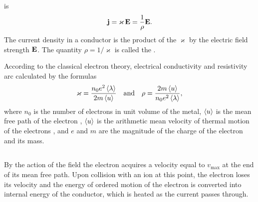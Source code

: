 \subsection{}\label{20.3.4}  is
\begin{equation*}%
\vb{j} = \varkappa \, \vb{E} = \frac{1}{\rho} \vb{E}.
\end{equation*}
The current density in a conductor is the product of the  $\varkappa$ by the electric field strength $\vb{E}$. The quantity $\rho = 1/\varkappa$ is called the .

According to the classical electron theory, electrical conductivity and resistivity arc calculated by the formulas
\begin{equation*}%
\varkappa = \frac{n_{0}e^{2}\expval{\lambda}}{2m \expval{u}} \qand \rho = \frac{2m \expval{u}}{n_{0}e^{2}\expval{\lambda}},
\end{equation*}
where $n_{0}$ is the number of electrons in unit volume of the metal, $\expval{u}$ is the mean free path of the electron , $\expval{u}$ is the arithmetic mean velocity of thermal motion of the electrons , and $e$ and $m$ are the magnitude of the charge of the electron and its mass.

\subsection{}\label{20.3.5} By the action of the field the electron acquires a velocity equal to $v_{\text{max}}$ at the end of its mean free path. Upon collision with an ion at this point, the electron loses its velocity and the energy of ordered motion of the electron is converted into internal energy of the conductor, which is heated as the current passes through.

